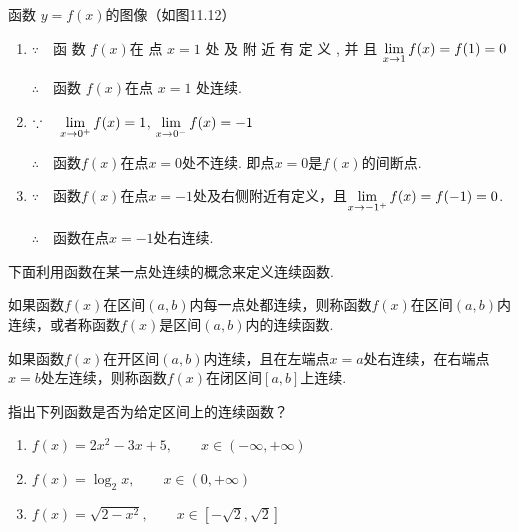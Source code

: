 \begin{solution}
    函数 $y=f(x)$的图像（如图11.12）

\noindent
\begin{minipage}{.58\textwidth}
\begin{enumerate}[(1)]
    \item $\because\quad $函 数 $f( x)$在 点 $x= 1$ 处 及 附 近 有 定 义 , 并 且 $\lim\limits_{x\to 1}f( x) = f(1)=0$

$\therefore\quad $函数 $f(x)$在点 $x=1$ 处连续.
\item $\because\quad \lim\limits_{x\to 0^+}f(x)=1$, $\lim\limits_{x\to 0^-} f(x)=-1$

$\therefore\quad $函数$f(x)$在点$x=0$处不连续. 即点$x=0$是$f(x)$的间断点.
\item $\because\quad $函数$f(x)$在点$x=-1$处及右侧附近有定义，且$\lim\limits_{x\to -1^+} f(x)=f(-1)=0$.

$\therefore\quad $函数在点$x=-1$处右连续.
\end{enumerate}    
\end{minipage}\hfill
\begin{minipage}{.4\textwidth}
\centering
{}
\end{minipage}    
\end{solution}

下面利用函数在某一点处连续的概念来定义连续函数.

如果函数$f(x)$在区间$(a,b)$内每一点处都连续，则称函数$f(x)$在区间$(a,b)$内连续，或者称函数$f(x)$是区间$(a,b)$内的连续函数.

如果函数$f(x)$在开区间$(a,b)$内连续，且在左端点$x=a$处右连续，在右端点$x=b$处左连续，则称函数$f(x)$在闭区间$[a,b]$上连续.

\begin{example}
    指出下列函数是否为给定区间上的连续函数？
\begin{enumerate}[(1)]
    \item $f(x)=2x^2-3x+5,\qquad x\in (-\infty,+\infty)$
    \item $f(x)=\log_2 x,\qquad x\in (0,+\infty)$
    \item $f(x)=\sqrt{2-x^2},\qquad x\in \left[-\sqrt{2},\sqrt{2}\right]$
\end{enumerate}
\end{example}

